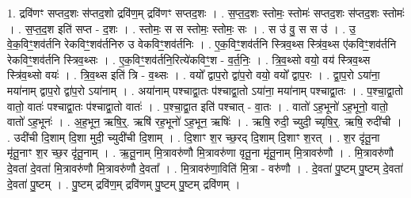 \documentclass[17pt]{extarticle}
\begin{document}
1. द्रवि॑णꣳ सप्तद॒शः स॑प्तद॒शो द्रवि॑ण॒म् द्रवि॑णꣳ सप्तद॒शः । . स॒प्त॒द॒शः स्तोमः॒ स्तोमः॑ सप्तद॒शः स॑प्तद॒शः स्तोमः॑ । . स॒प्त॒द॒श इति॑ सप्त - द॒शः । . स्तोमः॒ स स स्तोमः॒ स्तोमः॒ सः । . स उ॑ वु॒ स स उ॑ । . उ॒ वे॒क॒विꣳ॒॒शव॑र्तनि रेकविꣳ॒॒शव॑र्तनिरु उ वेकविꣳ॒॒शव॑र्तनिः । . ए॒क॒विꣳ॒॒शव॑र्तनि स्त्रिव॒थ्स स्त्रि॑व॒थ्स ए॑कविꣳ॒॒शव॑र्तनि रेकविꣳ॒॒शव॑र्तनि स्त्रिव॒थ्सः । . ए॒क॒विꣳ॒॒शव॑र्तनि॒रित्ये॑कविꣳ॒॒श - व॒र्त॒निः॒ । . त्रि॒व॒थ्सो वयो॒ वय॑ स्त्रिव॒थ्स स्त्रि॑व॒थ्सो वयः॑ । . त्रि॒व॒थ्स इति॑ त्रि - व॒थ्सः । . वयो᳚ द्वाप॒रो द्वा॑प॒रो वयो॒ वयो᳚ द्वाप॒रः । . द्वा॒प॒रो ऽया॑ना॒ मया॑नाम् द्वाप॒रो द्वा॑प॒रो ऽया॑नाम् । . अया॑नाम् पश्चाद्वा॒तः प॑श्चाद्वा॒तो ऽया॑ना॒ मया॑नाम् पश्चाद्वा॒तः । . प॒श्चा॒द्वा॒तो वातो॒ वातः॑ पश्चाद्वा॒तः प॑श्चाद्वा॒तो वातः॑ । . प॒श्चा॒द्वा॒त इति॑ पश्चात् - वा॒तः । . वातो॑ ऽह॒भूनो॑ ऽह॒भूनो॒ वातो॒ वातो॑ ऽह॒भूनः॑ । . अ॒ह॒भून॒ ऋषि॒र्॒. ऋषि॑ रह॒भूनो॑ ऽह॒भून॒ ऋषिः॑ । . ऋषि॒ रुदी॒ च्युदी॒ च्यृषि॒र्॒. ऋषि॒ रुदी॑ची । . उदी॑ची दि॒शाम् दि॒शा मुदी॒ च्युदी॑ची दि॒शाम् । . दि॒शाꣳ श॒र च्छ॒रद् दि॒शाम् दि॒शाꣳ श॒रत् । . श॒र दृ॑तू॒ना मृ॑तू॒नाꣳ श॒र च्छ॒र दृ॑तू॒नाम् । . ऋ॒तू॒नाम् मि॒त्रावरु॑णौ मि॒त्रावरु॑णा वृतू॒ना मृ॑तू॒नाम् मि॒त्रावरु॑णौ । . मि॒त्रावरु॑णौ दे॒वता॑ दे॒वता॑ मि॒त्रावरु॑णौ मि॒त्रावरु॑णौ दे॒वता᳚ । . मि॒त्रावरु॑णा॒विति॑ मि॒त्रा - वरु॑णौ । . दे॒वता॑ पु॒ष्टम् पु॒ष्टम् दे॒वता॑ दे॒वता॑ पु॒ष्टम् । . पु॒ष्टम् द्रवि॑ण॒म् द्रवि॑णम् पु॒ष्टम् पु॒ष्टम् द्रवि॑णम् । \newline
\end{document}
